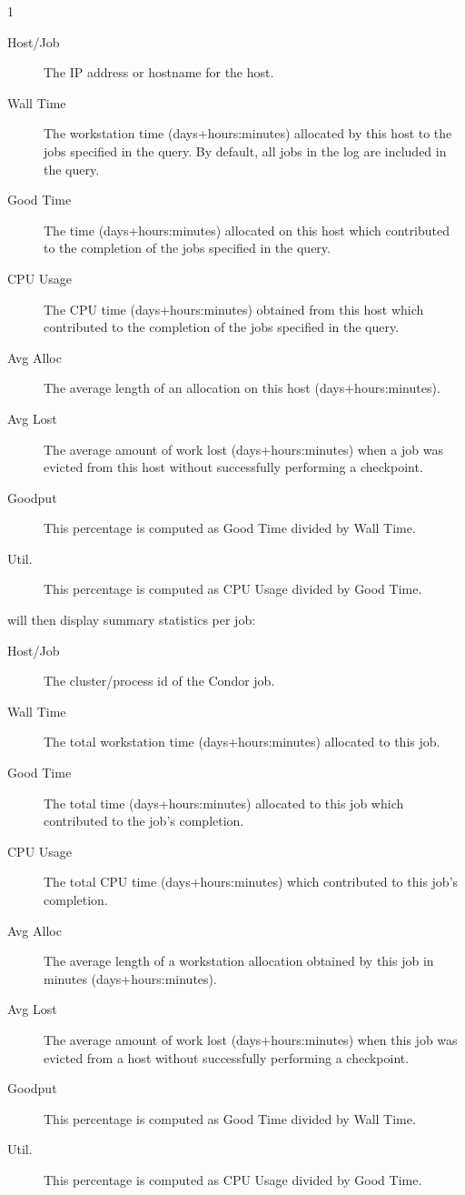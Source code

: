 \begin{ManPage}{\label{man-condor-userlog}}{1}
\begin{description}
\item[Host/Job] The IP address or hostname for the host.
\item[Wall Time] The workstation time (days+hours:minutes) allocated by
this host to the jobs specified in the query.  By default, all jobs in
the log are included in the query.
\item[Good Time] The time (days+hours:minutes) allocated on this host which
contributed to the completion of the jobs specified in the query.
\item[CPU Usage] The CPU time (days+hours:minutes) obtained from this
host which
contributed to the completion of the jobs specified in the query.
\item[Avg Alloc] The average length of an allocation on this host
(days+hours:minutes).
\item[Avg Lost] The average amount of work lost (days+hours:minutes) when a job
was evicted from this host without successfully performing a checkpoint.
\item[Goodput] This percentage is computed as Good Time divided by
Wall Time.
\item[Util.] This percentage is computed as CPU Usage divided by Good
Time.
\end{description}

 will then display summary statistics per job:

\begin{description}
\item[Host/Job] The cluster/process id of the Condor job.
\item[Wall Time] The total workstation time (days+hours:minutes) allocated to
this job.
\item[Good Time] The total time (days+hours:minutes) allocated to this
job which 
contributed to the job's completion.
\item[CPU Usage] The total CPU time (days+hours:minutes) which
contributed to this 
job's completion.
\item[Avg Alloc] The average length of a workstation allocation
obtained by this job in minutes (days+hours:minutes).
\item[Avg Lost] The average amount of work lost (days+hours:minutes)
when this job 
was evicted from a host without successfully performing a checkpoint.
\item[Goodput] This percentage is computed as Good Time divided by
Wall Time.
\item[Util.] This percentage is computed as CPU Usage divided by Good
Time.
\end{description}


\end{ManPage}
